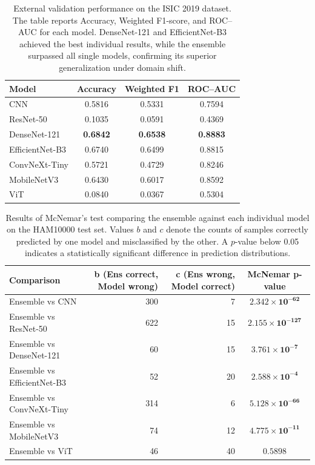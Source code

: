 \documentclass[pdflatex,sn-mathphys-num]{sn-jnl}%
\theoremstyle{thmstyleone}%
\theoremstyle{thmstyletwo}%
\theoremstyle{thmstylethree}%
\begin{document}
\begin{table}[!htbp]
\centering
\caption{External validation performance on the ISIC 2019 dataset. 
The table reports Accuracy, Weighted F1-score, and ROC–AUC for each model. 
DenseNet-121 and EfficientNet-B3 achieved the best individual results, while the ensemble surpassed all single models, confirming its superior generalization under domain shift.}
\label{tab:isic2019-results}
\footnotesize
\setlength{\tabcolsep}{4pt}
\renewcommand{\arraystretch}{1.1}
\begin{tabular*}{\textwidth}{@{\extracolsep\fill}lccc}
\toprule
\textbf{Model} & \textbf{Accuracy} & \textbf{Weighted F1} & \textbf{ROC–AUC} \\
\midrule
CNN             & 0.5816 & 0.5331 & 0.7594 \\
ResNet-50       & 0.1035 & 0.0591 & 0.4369 \\
DenseNet-121    & \textbf{0.6842} & \textbf{0.6538} & \textbf{0.8883} \\
EfficientNet-B3 & 0.6740 & 0.6499 & 0.8815 \\
ConvNeXt-Tiny   & 0.5721 & 0.4729 & 0.8246 \\
MobileNetV3     & 0.6430 & 0.6017 & 0.8592 \\
ViT             & 0.0840 & 0.0367 & 0.5304 \\
\bottomrule
\end{tabular*}
\end{table}

\begin{table}[!htbp]
\centering
\caption{Results of McNemar’s test comparing the ensemble against each individual model on the HAM10000 test set. 
Values $b$ and $c$ denote the counts of samples correctly predicted by one model and misclassified by the other. 
A $p$-value below 0.05 indicates a statistically significant difference in prediction distributions.}
\label{tab:mcnemar}
\footnotesize
\setlength{\tabcolsep}{4pt}
\renewcommand{\arraystretch}{1.1}
\begin{tabular*}{\textwidth}{@{\extracolsep\fill}lrrc}
\toprule
\textbf{Comparison} & \textbf{b (Ens correct, Model wrong)} & \textbf{c (Ens wrong, Model correct)} & \textbf{McNemar p-value} \\
\midrule
Ensemble vs {CNN}             & 300 & 7   & $\mathbf{2.342 \times 10^{-62}}$ \\
Ensemble vs {ResNet-50}       & 622 & 15  & $\mathbf{2.155 \times 10^{-127}}$\\
Ensemble vs {DenseNet-121}    & 60  & 15  & $\mathbf{3.761 \times 10^{-7}}$ \\
Ensemble vs {EfficientNet-B3} & 52  & 20  & $\mathbf{2.588 \times 10^{-4}}$ \\
Ensemble vs {ConvNeXt-Tiny}   & 314 & 6   & $\mathbf{5.128 \times 10^{-66}}$ \\
Ensemble vs {MobileNetV3}     & 74  & 12  & $\mathbf{4.775 \times 10^{-11}}$ \\
Ensemble vs {ViT}             & 46  & 40  & $0.5898$ \\
\bottomrule
\end{tabular*}
\end{table}
\end{document}
